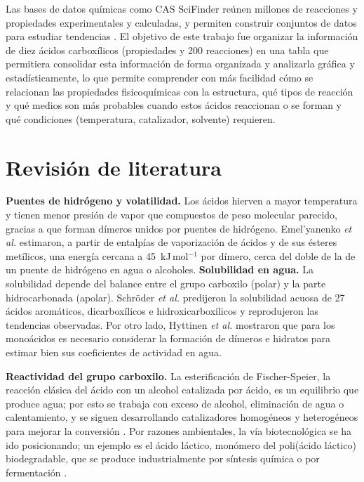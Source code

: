 \documentclass[twoside,twocolumn,10pt]{article}
\begin{document}
Las bases de datos químicas como CAS SciFinder reúnen millones de reacciones y propiedades experimentales y calculadas, y permiten construir conjuntos de datos para estudiar tendencias \cite{Gabrielson2018,CAS2026}. El objetivo de este trabajo fue organizar la información de diez ácidos carboxílicos (propiedades y 200 reacciones) en una tabla que permitiera consolidar esta información de forma organizada y analizarla gráfica y estadísticamente, lo que permite comprender con más facilidad cómo se relacionan las propiedades fisicoquímicas con la estructura, qué tipos de reacción y qué medios son más probables cuando estos ácidos reaccionan o se forman y qué condiciones (temperatura, catalizador, solvente) requieren.

\section{Revisión de literatura}
\fontsize{12}{14}\selectfont
\textbf{Puentes de hidrógeno y volatilidad.} Los ácidos hierven a mayor temperatura y tienen menor presión de vapor que compuestos de peso molecular parecido, gracias a que forman dímeros unidos por puentes de hidrógeno. Emel'yanenko \textit{et al.} \cite{Emelyanenko2020} estimaron, a partir de entalpías de vaporización de ácidos y de sus ésteres metílicos, una energía cercana a 45~kJ\,mol$^{-1}$ por dímero, cerca del doble de la de un puente de hidrógeno en agua o alcoholes. 
\textbf{Solubilidad en agua.} La solubilidad depende del balance entre el grupo carboxilo (polar) y la parte hidrocarbonada (apolar). Schröder \textit{et al.} \cite{Schroeder2010} predijeron la solubilidad acuosa de 27 ácidos aromáticos, dicarboxílicos e hidroxicarboxílicos y reprodujeron las tendencias observadas. Por otro lado, Hyttinen \textit{et al.} \cite{Hyttinen2020} mostraron que para los monoácidos es necesario considerar la formación de dímeros e hidratos para estimar bien sus coeficientes de actividad en agua.

\textbf{Reactividad del grupo carboxilo.} La esterificación de Fischer-Speier, la reacción clásica del ácido con un alcohol catalizada por ácido, es un equilibrio que produce agua; por esto se trabaja con exceso de alcohol, eliminación de agua o calentamiento, y se siguen desarrollando catalizadores homogéneos y heterogéneos para mejorar la conversión \cite{Mannu2024}. Por razones ambientales, la vía biotecnológica se ha ido posicionando; un ejemplo es el ácido láctico, monómero del poli(ácido láctico) biodegradable, que se produce industrialmente por síntesis química o por fermentación \cite{Wee2006}.
\end{document}
